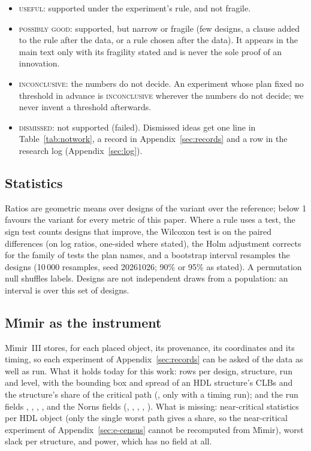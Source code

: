 \begin{itemize}
\item \textsc{useful}: supported under the experiment's rule, and not fragile.
\item \textsc{possibly good}: supported, but narrow or fragile (few designs, a clause added to the rule after the data, or a rule chosen after the data). It appears in the main text only with its fragility stated and is never the sole proof of an innovation.
\item \textsc{inconclusive}: the numbers do not decide. An experiment whose plan fixed no threshold in advance is \textsc{inconclusive} wherever the numbers do not decide; we never invent a threshold afterwards.
\item \textsc{dismissed}: not supported (failed). Dismissed ideas get one line in Table~\ref{tab:notwork}, a record in Appendix~\ref{sec:records} and a row in the research log (Appendix~\ref{sec:log}).
\end{itemize}

\subsection{Statistics}
\label{sec:stats}

Ratios are geometric means over designs of the variant over the reference; below 1 favours the variant for every metric of this paper. Where a rule uses a test, the sign test counts designs that improve, the Wilcoxon test is on the paired differences (on log ratios, one-sided where stated), the Holm adjustment corrects for the family of tests the plan names, and a bootstrap interval resamples the designs (10\,000 resamples, seed 20261026; 90\% or 95\% as stated). A permutation null shuffles labels. Designs are not independent draws from a population: an interval is over this set of designs.

\subsection{M\'{\i}mir as the instrument}
\label{sec:mimir}

M\'{\i}mir~III stores, for each placed object, its provenance, its coordinates and its timing, so each experiment of Appendix~\ref{sec:records} can be asked of the data as well as run. What it holds today for this work:  rows per design, structure, run and level, with the bounding box and spread of an HDL structure's CLBs and the structure's share of the critical path (, only with a timing run); and the run fields , , , ,  and the Norns fields (, , , , ). What is missing: near-critical statistics per HDL object (only the single worst path gives a share, so the near-critical experiment of Appendix~\ref{sec:e-census} cannot be recomputed from M\'{\i}mir), worst slack per structure, and power, which has no field at all.
